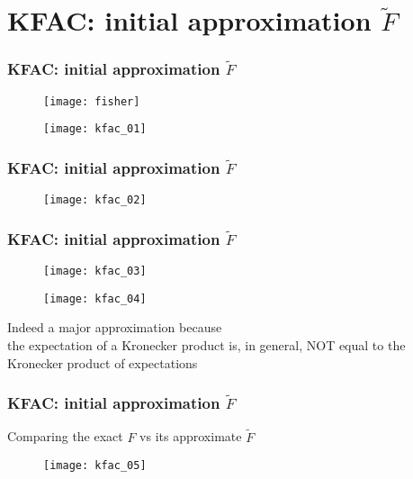 \section{KFAC: initial approximation $\tilde{F}$}

\begin{frame}
\frametitle{KFAC: initial approximation $\tilde{F}$}

\begin{figure}
    \centering
    \texttt{[image: fisher]}
\end{figure}

\begin{figure}
    \centering
    \texttt{[image: kfac\_01]}
\end{figure}

\end{frame}

\begin{frame}
\frametitle{KFAC: initial approximation $\tilde{F}$}

\begin{figure}
    \centering
    \texttt{[image: kfac\_02]}
\end{figure}

\end{frame}

\begin{frame}
\frametitle{KFAC: initial approximation $\tilde{F}$}

\begin{figure}
    \centering
    \texttt{[image: kfac\_03]}
\end{figure}

\begin{figure}
    \centering
    \texttt{[image: kfac\_04]}
\end{figure}

Indeed a major approximation because\\
the expectation of a Kronecker product is, in general, NOT
equal to the Kronecker product of expectations

\end{frame}

\begin{frame}
\frametitle{KFAC: initial approximation $\tilde{F}$}
Comparing the exact $F$ vs its approximate $\tilde{F}$
\begin{figure}
    \centering
    \texttt{[image: kfac\_05]}
\end{figure}

\end{frame}


